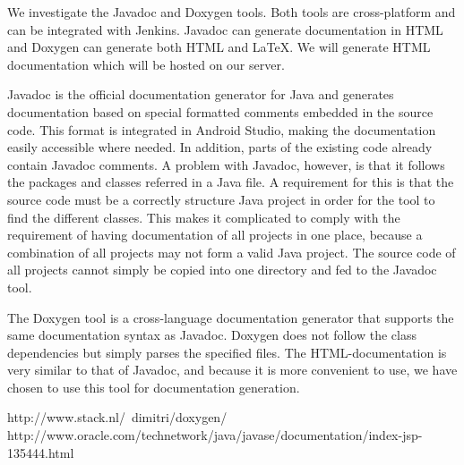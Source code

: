 We investigate the Javadoc and Doxygen tools. Both tools are cross-platform and can be integrated with Jenkins. Javadoc can generate documentation in HTML and Doxygen can generate both HTML and \LaTeX. We will generate HTML documentation which will be hosted on our server.

Javadoc is the official documentation generator for Java and generates documentation based on special formatted comments embedded in the source code. This format is integrated in Android Studio, making the documentation easily accessible where needed. In addition, parts of the existing code already contain Javadoc comments. A problem with Javadoc, however, is that it follows the packages and classes referred in a Java file. A requirement for this is that the source code must be a correctly structure Java project in order for the tool to find the different classes. This makes it complicated to comply with the requirement of having documentation of all projects in one place, because a combination of all projects may not form a valid Java project. The source code of all projects cannot simply be copied into one directory and fed to the Javadoc tool.

The Doxygen tool is a cross-language documentation generator that supports the same documentation syntax as Javadoc. Doxygen does not follow the class dependencies but simply parses the specified files. The HTML-documentation is very similar to that of Javadoc, and because it is more convenient to use, we have chosen to use this tool for documentation generation.

http://www.stack.nl/~dimitri/doxygen/
http://www.oracle.com/technetwork/java/javase/documentation/index-jsp-135444.html
